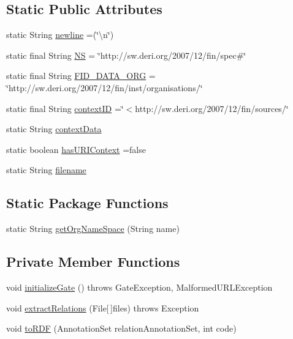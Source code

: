 \subsection*{Static Public Attributes}
\begin{DoxyCompactItemize}
\item 
static String \hyperlink{class_h_l_t_tutorial_adb4199589eaaf5b9598cc2b2f7590659}{newline} =(\char`\"{}\textbackslash{}n\char`\"{})
\item 
static final String \hyperlink{class_h_l_t_tutorial_a26ee4eae95ef93834a86936c107361b0}{N\-S} = \char`\"{}http\-://sw.\-deri.\-org/2007/12/fin/spec\#\char`\"{}
\item 
static final String \hyperlink{class_h_l_t_tutorial_aa4a2bd88329f2c78cd648c7242be3086}{F\-I\-D\-\_\-\-D\-A\-T\-A\-\_\-\-O\-R\-G} = \char`\"{}http\-://sw.\-deri.\-org/2007/12/fin/inst/organisations/\char`\"{}
\item 
static final String \hyperlink{class_h_l_t_tutorial_a8f7520df09b1deb0b52f1cd2341d14dd}{context\-I\-D} =\char`\"{}$<$http\-://sw.\-deri.\-org/2007/12/fin/sources/\char`\"{}
\item 
static String \hyperlink{class_h_l_t_tutorial_af324de58fa0893753bf1d449a959be55}{context\-Data}
\item 
static boolean \hyperlink{class_h_l_t_tutorial_a25e52e2c4a0580906443617dd11e5050}{has\-U\-R\-I\-Context} =false
\item 
static String \hyperlink{class_h_l_t_tutorial_ab4c914d0fd25e0dfcb7fdeb677b26211}{filename}
\end{DoxyCompactItemize}
\subsection*{Static Package Functions}
\begin{DoxyCompactItemize}
\item 
static String \hyperlink{class_h_l_t_tutorial_a81baeb2bb51fe4720470dabfb269b102}{get\-Org\-Name\-Space} (String name)
\end{DoxyCompactItemize}
\subsection*{Private Member Functions}
\begin{DoxyCompactItemize}
\item 
void \hyperlink{class_h_l_t_tutorial_a1644de472a2045b79bb8810049b83a1d}{initialize\-Gate} ()  throws Gate\-Exception, Malformed\-U\-R\-L\-Exception 
\item 
void \hyperlink{class_h_l_t_tutorial_ae9b6976cecdeefda137c1b3e2cb6636d}{extract\-Relations} (File\mbox{[}$\,$\mbox{]}files)  throws Exception 
\item 
void \hyperlink{class_h_l_t_tutorial_a5f66220b793be678dbd3d5e75bb017f0}{to\-R\-D\-F} (Annotation\-Set relation\-Annotation\-Set, int code)
\end{DoxyCompactItemize}
